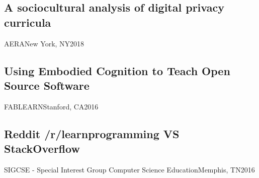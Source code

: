 \documentclass[../main.tex]{subfiles}
\begin{document}
\subsection{A sociocultural analysis of digital privacy curricula}{AERA}{New York, NY}{2018}
	\hfill

\subsection{Using Embodied Cognition to Teach Open Source Software}{FABLEARN}{Stanford, CA}{2016}
	\hfill

	\subsection{Reddit /r/learnprogramming VS StackOverflow}{SIGCSE - Special Interest Group Computer Science Education}{Memphis, TN}{2016}
	\hfill
\end{document}
